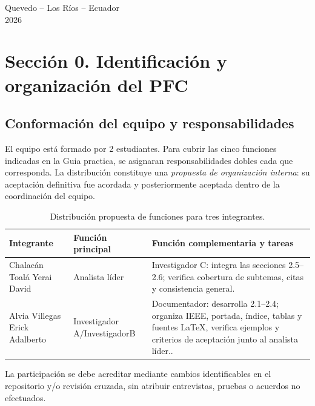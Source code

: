 \begin{titlepage}
    \vspace{0.5cm}

\vfill
{\small Quevedo -- Los Ríos -- Ecuador\\ 2026\par}
\end{titlepage}
\hypersetup{pageanchor=true}
\tableofcontents
\clearpage

\section{Sección 0. Identificación y organización del PFC}
\subsection{Conformación del equipo y responsabilidades}
El equipo está formado por 2 estudiantes. Para cubrir las cinco funciones indicadas en la Guia practica, se asignaran responsabilidades dobles cada que corresponda. La distribución constituye una \emph{propuesta de organización interna}: su aceptación definitiva fue acordada y posteriormente aceptada dentro de la coordinación del equipo.
\begin{table}[H]\centering\small
\caption{Distribución propuesta de funciones para tres integrantes.}\label{tab:roles}
\begin{tabularx}{\linewidth}{@{}p{4.4cm}p{3cm}X@{}}\toprule
\textbf{Integrante} & \textbf{Función principal} & \textbf{Función complementaria y tareas}\\\midrule
Chalacán Toalá Yerai David & Analista líder & Investigador C: integra las secciones 2.5--2.6; verifica cobertura de subtemas, citas y consistencia general.\\
Alvia Villegas Erick Adalberto & Investigador A/InvestigadorB & Documentador: desarrolla 2.1--2.4; organiza IEEE, portada, índice, tablas y fuentes LaTeX, verifica ejemplos y criterios de aceptación junto al analista líder..\\
\bottomrule
\end{tabularx}
\end{table}
La participación se debe acreditar mediante cambios identificables en el repositorio y/o revisión cruzada, sin atribuir entrevistas, pruebas o acuerdos no efectuados.
